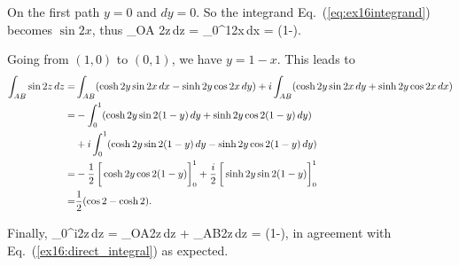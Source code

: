 \documentclass[10pt, letterpaper]{article}
\begin{document}
\begin{itemize}
	On the first path $y=0$ and $dy=0$. So the integrand Eq.~(\ref{eq:ex16integrand}) becomes $\sin 2x$, thus
	\be
		\int_{OA} \sin 2z\,dz = \int_0^1\sin 2x\,dx  = (1-). \nonumber
	\ee

	Going from $(1,0)$ to $(0,1)$, we have $y=1-x$. This leads to
	\begin{align}
		\int_{AB} \sin 2z\,dz
			=& \int_{AB} (\cosh 2y\sin 2x\,dx - \sinh 2y\cos 2x\,dy) + 
			   i\int_{AB} (\cosh 2y\sin 2x\,dy + \sinh 2y\cos 2x\,dx) \nonumber\\
			=& -\int_0^1 (\cosh 2y\sin 2(1-y)\,dy + \sinh 2y\cos 2(1-y)\,dy) \nonumber \\
			 & + i\int_0^1 (\cosh 2y\sin 2(1-y)\,dy - \sinh 2y\cos 2(1-y)\,dy) \nonumber\\
			=& -\frac{1}{2}\left[\vphantom{\int} \cosh 2y \cos 2(1-y)\right]_0^1 
			   + \frac{i}{2}\left[\vphantom{\int} \sinh2y \sin 2(1-y)\right]_0^1 \nonumber\\
			=& \frac{1}{2}(\cos 2 - \cosh 2). \nonumber
	\end{align}

	Finally,
	\be
		\int_0^i\sin 2z\,dz = \int_{OA}\sin 2z\,dz + \int_{AB}\sin 2z\,dz = (1-),
	\ee
	in agreement with Eq.~(\ref{ex16:direct_integral}) as expected.

\end{itemize}
\end{document}
